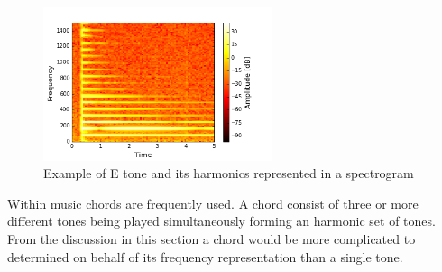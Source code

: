 \begin{figure}[H]
    \centering
    \includegraphics[width = 0.6\textwidth]{figures/Music/eks_ch2.png}
    \caption{Example of E tone and its harmonics represented in a spectrogram}
    \label{fig:E_spec}
\end{figure}
Within music chords are frequently used. A chord consist of three or more different tones being played simultaneously forming an harmonic set of tones. From the discussion in this section a chord would be more complicated to determined on behalf of its frequency representation than a single tone.

